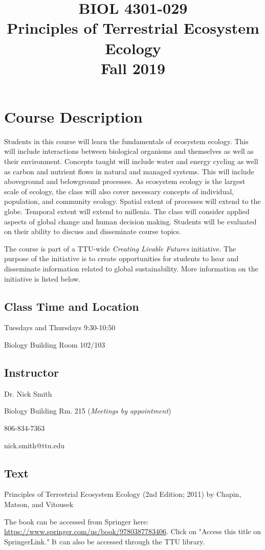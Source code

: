 \documentclass[12pt, notitlepage]{article}   	%
\title{
	\textbf{
		BIOL 4301-029
	} \\
	\large Principles of Terrestrial Ecosystem Ecology \\
	\large Fall 2019
}
\date{\vspace{-5ex}}
\begin{document}
{\selectfont %

\maketitle

\section{Course Description}
Students in this course will learn the fundamentals of ecosystem ecology.
This will include interactions between biological organisms and themselves as well as
their environment. Concepts taught will include water and energy cycling as well as carbon
and nutrient flows in natural and managed systems.
This will include aboveground and belowground processes.
As ecosystem ecology is the largest scale of ecology, the class will also cover necessary
concepts of individual, population, and community ecology.
Spatial extent of processes will extend to the globe. Temporal extent will extend to 
millenia. The class will consider applied aspects of global change and human decision making.
Students will be evaluated on their 
ability to discuss and disseminate course topics.

The course is part of a TTU-wide \textit{Creating Livable Futures} initiative.
The purpose of the initiative is to create opportunities for students to hear and
disseminate information related to global sustainability. More information on the
initiative is listed below.

\subsection{Class Time and Location}
Tuesdays and Thursdays 9:30-10:50

Biology Building Room 102/103

\newpage

\subsection{Instructor}
Dr. Nick Smith \par
Biology Building Rm. 215 (\textit{Meetings by appointment}) \par
806-834-7363 \par
nick.smith@ttu.edu \par

\subsection{Text}
Principles of Terrestrial Ecosystem Ecology (2nd Edition; 2011) 
by Chapin, Matson, and Vitousek \par
The book can be accessed from Springer here: 
\url{https://www.springer.com/us/book/9780387783406}. Click on "Access this title on 
SpringerLink." It can also be accessed through the TTU library.

}
\end{document}
